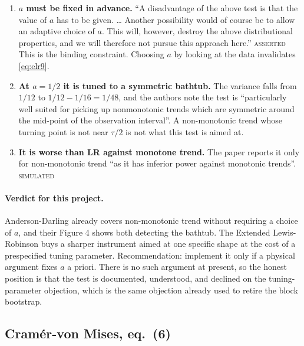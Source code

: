 \documentclass[11pt,a4paper]{article}
\newcommand{\SIMULATED}{\textsc{\textcolor{orange!70!black}{simulated}}}
\newcommand{\ASSERTED}{\textsc{\textcolor{purple!70!black}{asserted}}}
\begin{document}
\begin{enumerate}[leftmargin=1.6em,itemsep=3pt]
\item \textbf{$a$ must be fixed in advance.} \enquote{A disadvantage of the above test
is that the value of $a$ has to be given. \dots{} Another possibility would of course be to
allow an adaptive choice of $a$. This will, however, destroy the above distributional properties,
and we will therefore not pursue this approach here.} \ASSERTED{} This is the binding
constraint. Choosing $a$ by looking at the data invalidates \eqref{eq:elr9}.

\item \textbf{At $a = 1/2$ it is tuned to a symmetric bathtub.} The variance falls from
$1/12$ to $1/12 - 1/16 = 1/48$, and the authors note the test is
\enquote{particularly well suited for picking up nonmonotonic trends which are
symmetric around the mid-point of the observation interval}. A non-monotonic trend whose
turning point is not near $\tau/2$ is not what this test is aimed at.

\item \textbf{It is worse than LR against monotone trend.} The paper reports it only for
non-monotonic trend \enquote{as it has inferior power against monotonic trends}.
\SIMULATED
\end{enumerate}

\paragraph{Verdict for this project.} Anderson-Darling already covers non-monotonic
trend without requiring a choice of $a$, and their Figure 4 shows both detecting the
bathtub. The Extended Lewis-Robinson buys a sharper instrument aimed at one specific
shape at the cost of a prespecified tuning parameter. Recommendation: implement it only
if a physical argument fixes $a$ a priori. There is no such argument at present, so the
honest position is that the test is documented, understood, and declined on the
tuning-parameter objection, which is the same objection already used to retire the block
bootstrap.

\subsection{Cramér-von Mises, eq.~(6)}
\end{document}
